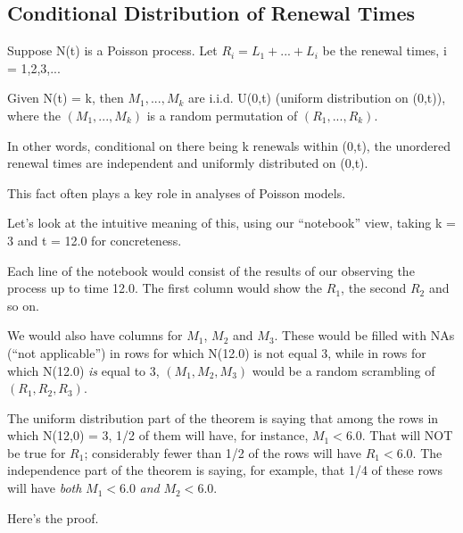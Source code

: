 \subsection{Conditional Distribution of Renewal Times}

\begin{theorem}

Suppose N(t) is a Poisson process.  Let $R_i = L_1+...+L_i$ be the
renewal times, i = 1,2,3,...

Given N(t) = k, then $M_{1},...,M_{k}$ are i.i.d. U(0,t) (uniform
distribution on (0,t)), where the $(M_1,...,M_k)$ is a random
permutation of $(R_1,...,R_k)$.  

In other words, conditional on there being k renewals within (0,t), the
unordered renewal times are independent and uniformly distributed on
(0,t).  

\end{theorem}

This fact often plays a key role in analyses of Poisson models.

Let's look at the intuitive meaning of this, using our ``notebook''
view, taking k = 3 and t = 12.0 for concreteness.

Each line of the notebook would consist of the results of our observing
the process up to time 12.0.  The first column would show the $R_1$, the
second $R_2$ and so on.

We would also have columns for $M_1$, $M_2$ and $M_3$.  These would be
filled with NAs (``not applicable'') in rows for which N(12.0) is not
equal 3, while in rows for which N(12.0) {\it is} equal to 3,
$(M_1,M_2,M_3)$ would be a random scrambling of $(R_1,R_2,R_3)$.  

The uniform distribution part of the theorem is saying that among the
rows in which N(12,0) = 3, 1/2 of them will have, for instance, $M_1 <
6.0$.  That will NOT be true for $R_1$; considerably fewer than 1/2 of
the rows will have $R_1 < 6.0$.  The independence part of the theorem is
saying, for example, that 1/4 of these rows will have {\it both} $M_1 <
6.0$ {\it and} $M_2 < 6.0$.

Here's the proof.

